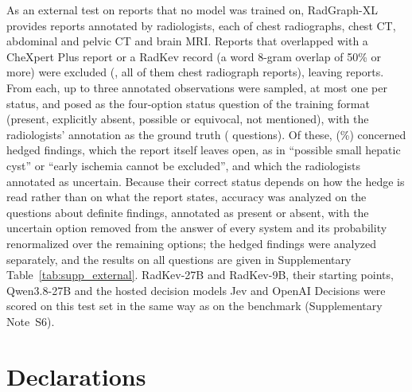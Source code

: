 \documentclass[11pt]{article}
\begin{document}
As an external test on reports that no model was trained on, RadGraph-XL \citep{delbrouck2024radgraphxl} provides  reports annotated by radiologists,  each of chest radiographs, chest CT, abdominal and pelvic CT and brain MRI. Reports that overlapped with a CheXpert Plus report or a RadKev record (a word 8-gram overlap of 50\% or more) were excluded (, all of them chest radiograph reports), leaving  reports. From each, up to three annotated observations were sampled, at most one per status, and posed as the four-option status question of the training format (present, explicitly absent, possible or equivocal, not mentioned), with the radiologists' annotation as the ground truth ( questions). Of these,  (\%) concerned hedged findings, which the report itself leaves open, as in ``possible small hepatic cyst'' or ``early ischemia cannot be excluded'', and which the radiologists annotated as uncertain. Because their correct status depends on how the hedge is read rather than on what the report states, accuracy was analyzed on the  questions about definite findings, annotated as present or absent, with the uncertain option removed from the answer of every system and its probability renormalized over the remaining options; the hedged findings were analyzed separately, and the results on all  questions are given in Supplementary Table~\ref{tab:supp_external}. RadKev-27B and RadKev-9B, their starting points, Qwen3.8-27B and the hosted decision models Jev and OpenAI Decisions were scored on this test set in the same way as on the benchmark (Supplementary Note~S6).
\FloatBarrier






\section*{Declarations}
\end{document}
